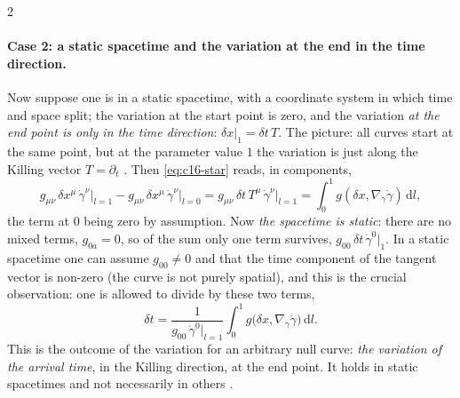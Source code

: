 \begin{paracol}{2}
\paragraph{Case 2: a static spacetime and the variation at the end in the time direction.} Now suppose one is in a static spacetime, with a coordinate system in which time and space split; the variation at the start point is zero, and the variation \emph{at the end point is only in the time direction}: $\delta x|_1=\delta t\,T$. The picture: all curves start at the same point, but at the parameter value $1$ the variation is just along the Killing vector $T=\partial_t$ . Then \eqref{eq:c16-star} reads, in components,
\[
  g_{\mu\nu}\,\delta x^\mu\,\dot\gamma^\nu\Big|_{l=1}-g_{\mu\nu}\,\delta x^\mu\,\dot\gamma^\nu\Big|_{l=0}=g_{\mu\nu}\,\delta t\,T^\mu\,\dot\gamma^\nu\Big|_{l=1}=\int_0^1g(\delta x,\nabla_{\dot\gamma}\dot\gamma)\,\mathrm dl,
\]
the term at $0$ being zero by assumption. Now \emph{the spacetime is static}: there are no mixed terms, $g_{0a}=0$, so of the sum only one term survives, $g_{00}\,\delta t\,\dot\gamma^0|_1$. In a static spacetime one can assume $g_{00}\neq0$ and that the time component of the tangent vector is non-zero (the curve is not purely spatial), and this is the crucial observation: one is allowed to divide by these two terms,
\begin{equation}\label{eq:c16-deltat}
  \delta t=\frac{1}{g_{00}\,\dot\gamma^0\big|_{l=1}}\int_0^1g\bigl(\delta x,\nabla_{\dot\gamma}\dot\gamma\bigr)\,\mathrm dl.
\end{equation}
This is the outcome of the variation for an arbitrary null curve: \emph{the variation of the arrival time}, in the Killing direction, at the end point. It holds in static spacetimes and not necessarily in others .


\end{paracol}
